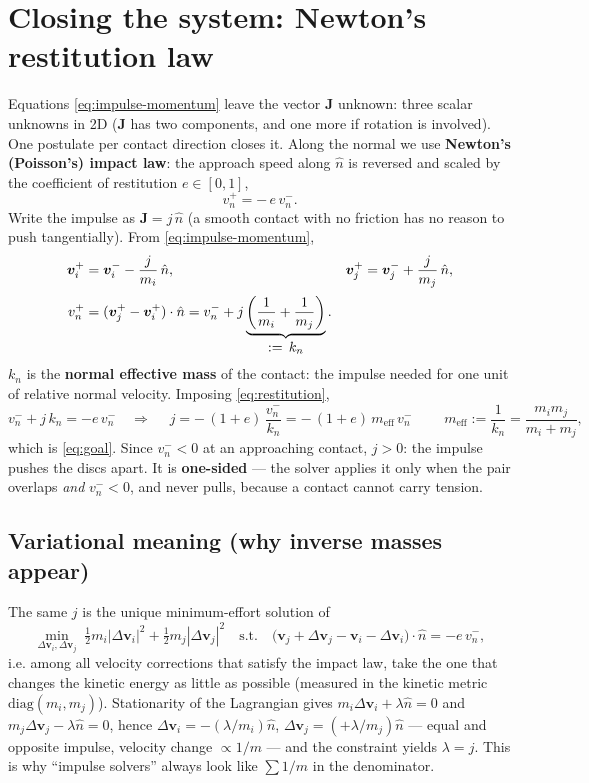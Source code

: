 \documentclass[a4paper,11pt]{article}
\newcommand{\vV}{\bm{v}}
\newcommand{\Jimp}{\bm{J}}
\newcommand{\hh}{\hat{n}}
\begin{document}
\section{Closing the system: Newton's restitution law}
\label{sec:restitution}

Equations \eqref{eq:impulse-momentum} leave the vector $\Jimp$ unknown: three
scalar unknowns in 2D ($\Jimp$ has two components, and one more if rotation is
involved). One postulate per contact direction closes it. Along the normal we
use \textbf{Newton's (Poisson's) impact law}: the approach speed along $\hh$ is
reversed and scaled by the coefficient of restitution $e\in[0,1]$,
\begin{equation}
  v_n^{+}=-\,e\,v_n^{-}.
  \label{eq:restitution}
\end{equation}
Write the impulse as $\Jimp=j\,\hh$ (a smooth contact with no friction has no
reason to push tangentially). From \eqref{eq:impulse-momentum},
\begin{align}
  \vV_i^{+}&=\vV_i^{-}-\frac{j}{m_i}\,\hh, &
  \vV_j^{+}&=\vV_j^{-}+\frac{j}{m_j}\,\hh , \notag\\[2pt]
  v_n^{+}&=(\vV_j^{+}-\vV_i^{+})\cdot\hh
        =v_n^{-}+j\underbrace{\left(\frac{1}{m_i}+\frac{1}{m_j}\right)}
        _{\textstyle :=\,k_n} . \label{eq:kn}
\end{align}
$k_n$ is the \textbf{normal effective mass} of the contact: the impulse needed
for one unit of relative normal velocity. Imposing \eqref{eq:restitution},
\[
  v_n^{-}+j\,k_n=-e\,v_n^{-}
  \quad\Longrightarrow\quad
  \boxed{\;j=-\,(1+e)\,\frac{v_n^{-}}{k_n}
        =-\,(1+e)\,m_{\text{eff}}\,v_n^{-}\;}
  \qquad
  m_{\text{eff}}:=\frac{1}{k_n}=\frac{m_i m_j}{m_i+m_j},
\]
which is \eqref{eq:goal}. Since $v_n^{-}<0$ at an approaching contact, $j>0$:
the impulse pushes the discs apart. It is \textbf{one-sided} --- the solver
applies it only when the pair overlaps \emph{and} $v_n^{-}<0$, and never pulls,
because a contact cannot carry tension.

\subsection{Variational meaning (why inverse masses appear)}
The same $j$ is the unique minimum-effort solution of
\begin{equation}
  \min_{\Delta\vV_i,\Delta\vV_j}\;
  \tfrac12 m_i|\Delta\vV_i|^2+\tfrac12 m_j|\Delta\vV_j|^2
  \quad\text{s.t.}\quad
  \bigl(\vV_j+\Delta\vV_j-\vV_i-\Delta\vV_i\bigr)\cdot\hh=-e\,v_n^{-},
  \label{eq:variational}
\end{equation}
i.e. among all velocity corrections that satisfy the impact law, take the one
that changes the kinetic energy as little as possible (measured in the kinetic
metric $\mathrm{diag}(m_i,m_j)$). Stationarity of the Lagrangian gives
$m_i\Delta\vV_i+\lambda\hh=0$ and $m_j\Delta\vV_j-\lambda\hh=0$, hence
$\Delta\vV_i=-(\lambda/m_i)\hh$, $\Delta\vV_j=(+\lambda/m_j)\hh$ --- equal and
opposite impulse, velocity change $\propto 1/m$ --- and the constraint yields
$\lambda=j$. This is why ``impulse solvers'' always look like
$\sum 1/m$ in the denominator.
\end{document}
